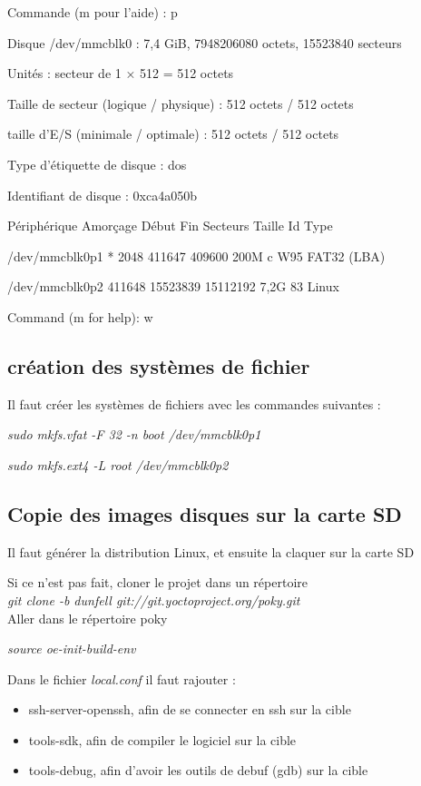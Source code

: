 {\begin{minipage}{0.9\textwidth}
Commande (m pour l'aide) : p

Disque /dev/mmcblk0 : 7,4 GiB, 7948206080 octets, 15523840 secteurs

Unités : secteur de 1 × 512 = 512 octets

Taille de secteur (logique / physique) : 512 octets / 512 octets

taille d'E/S (minimale / optimale) : 512 octets / 512 octets

Type d'étiquette de disque : dos

Identifiant de disque : 0xca4a050b



Périphérique Amorçage Début Fin Secteurs Taille Id Type

/dev/mmcblk0p1 * 2048 411647 409600 200M c W95 FAT32 (LBA)

/dev/mmcblk0p2 411648 15523839 15112192 7,2G 83 Linux





Command (m for help): w

\end{minipage}}

\subsection{création des systèmes de fichier}

Il faut créer les systèmes de fichiers avec les commandes suivantes : 


\textit{sudo mkfs.vfat -F 32 -n boot /dev/mmcblk0p1}

\textit{sudo mkfs.ext4 -L root /dev/mmcblk0p2}



\subsection{Copie des images disques sur  la carte SD}


Il faut générer la distribution Linux, et ensuite la claquer sur la carte SD

Si ce n'est pas fait, cloner le projet dans un répertoire
\\

\textit{git clone -b dunfell git://git.yoctoproject.org/poky.git}
\\
Aller dans le répertoire poky

\textit{source oe-init-build-env}

Dans le fichier \textit{local.conf} il faut rajouter : 
\begin{itemize}
\item ssh-server-openssh, afin de se connecter en ssh sur la cible
\item tools-sdk, afin de compiler le logiciel sur la cible
\item tools-debug, afin d'avoir les outils de debuf (gdb) sur la cible

\end{itemize}

